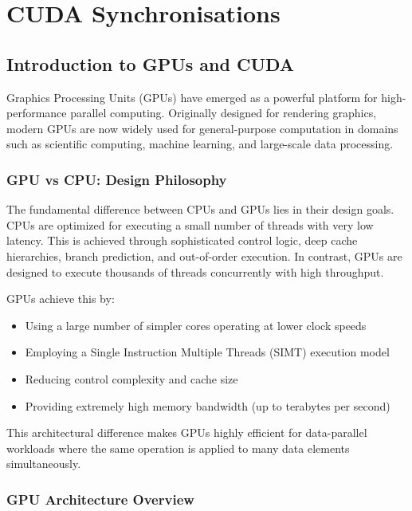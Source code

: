 \chapter{CUDA Synchronisations}

\newcommand{\code}[1]{\texttt{#1}}
\newcommand{\synct}{\code{\_\_syncthreads()}}

\section{Introduction to GPUs and CUDA}

Graphics Processing Units (GPUs) have emerged as a powerful platform for high-performance parallel computing. Originally designed for rendering graphics, modern GPUs are now widely used for general-purpose computation in domains such as scientific computing, machine learning, and large-scale data processing.

\subsection{GPU vs CPU: Design Philosophy}

The fundamental difference between CPUs and GPUs lies in their design goals. CPUs are optimized for executing a small number of threads with very low latency. This is achieved through sophisticated control logic, deep cache hierarchies, branch prediction, and out-of-order execution. In contrast, GPUs are designed to execute thousands of threads concurrently with high throughput. \cite{gpu_lecture}

GPUs achieve this by:
\begin{itemize}
    \item Using a large number of simpler cores operating at lower clock speeds
    \item Employing a Single Instruction Multiple Threads (SIMT) execution model
    \item Reducing control complexity and cache size
    \item Providing extremely high memory bandwidth (up to terabytes per second)
\end{itemize}

This architectural difference makes GPUs highly efficient for data-parallel workloads where the same operation is applied to many data elements simultaneously.

\subsection{GPU Architecture Overview}

